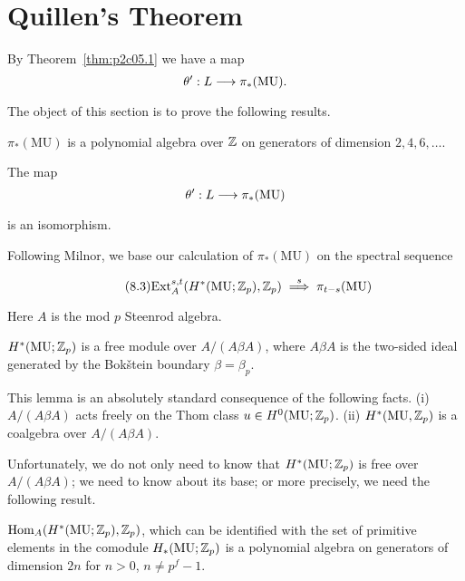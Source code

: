 \documentclass[../main]{subfiles}
\begin{document}
\label{sec:p2c8}

\chapter{Quillen's Theorem}
By Theorem~\ref{thm:p2c05.1} we have a map \[\theta' : L \lar{} \pi_\ast(\mathrm{MU}).\] The object of this section is to prove the following results. 

\begin{theorem}[Milnor]
\label{thm:p2c08.1}
$\pi_\ast(\mathrm{MU})$ is a polynomial algebra over $\mathbb{Z}$ on generators of dimension $2, 4, 6, \ldots$. 
\end{theorem}

\begin{theorem}[Quillen]
\label{thm:p2c08.2}
The map \[\theta' : L \lar{} \pi_\ast(\mathrm{MU})\] is an isomorphism.
\end{theorem}

Following Milnor, we base our calculation of $\pi_\ast(\mathrm{MU})$ on the spectral sequence

\begin{equation}
\tag{8.3}
\label{eqn:p2c08.3}
\mathrm{Ext}_A^{s, t} (H^\ast(\mathrm{MU}; \mathbb{Z}_p), \mathbb{Z}_p) \overset{s}{\implies} \pi_{t - s}(\mathrm{MU})
\end{equation}

Here $A$ is the mod $p$ Steenrod algebra.

\begin{lemma}
\label{lem:p2c08.4}
$H^\ast(\mathrm{MU}; \mathbb{Z}_p)$ is a free module over $A/(A \beta A)$, where $A \beta A$ is the two-sided ideal generated by the Bokštein boundary $\beta = \beta_p$. 
\end{lemma}

This lemma is an absolutely standard consequence of the following facts. (i) $A/(A \beta A)$ acts freely on the Thom class $u \in H^0(\mathrm {MU}; \mathbb{Z}_p)$. (ii) $H^\ast(\mathrm{MU}, \mathbb{Z}_p)$ is a coalgebra over $A/(A \beta A)$.

Unfortunately, we do not only need to know that $H^\ast(\mathrm{MU}; \mathbb{Z}_p)$ is free over $A/(A \beta A)$; we need to know about its base; or more precisely, we need the following result. 

\begin{lemma}
\label{lem:p2c08.5}
$\mathrm{Hom}_A(H^\ast(\mathrm{MU}; \mathbb{Z}_p), \mathbb{Z}_p)$, which can be identified with the set of primitive elements in the comodule $H_\ast(\mathrm{MU}; \mathbb{Z}_p)$ is a polynomial algebra on generators of dimension $2n$ for $n > 0$, $n \ne p^f - 1$.
\end{lemma}
\end{document}
